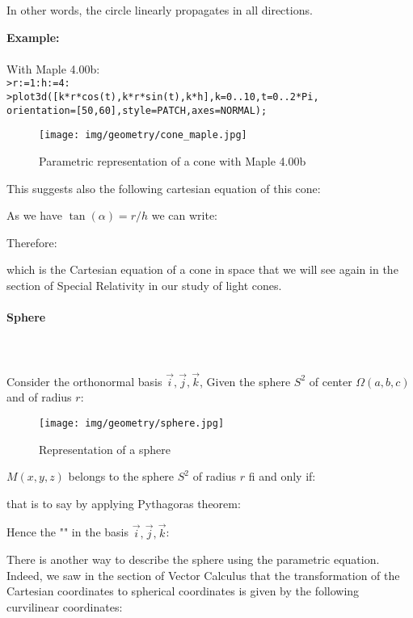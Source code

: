 {	In other words, the circle linearly propagates in all directions.
	\begin{tcolorbox}[colframe=black,colback=white,sharp corners]
	\textbf{{\Large {}}Example:}\\\\
	With Maple 4.00b:\\

	\texttt{>r:=1:h:=4:\\
	>plot3d([k*r*cos(t),k*r*sin(t),k*h],k=0..10,t=0..2*Pi,\\
	orientation=[50,60],style=PATCH,axes=NORMAL);
	}
	\begin{figure}[H]
		\centering
		\texttt{[image: img/geometry/cone\_maple.jpg]}
		\caption{Parametric representation of a cone with Maple 4.00b}
	\end{figure}
	\end{tcolorbox}
	This suggests also the following cartesian equation of this cone:
	
	As we have $\tan(\alpha)=r/h$ we can write:
	
	Therefore:
	
	which is the Cartesian equation of a cone in space that we will see again in the section of Special Relativity in our study of light cones.
	
	\paragraph{Sphere}\mbox{}\\\\
	Consider the orthonormal basis ${\vec{i},\vec{j},\vec{k}}$, Given the sphere $S^2$ of  center $\Omega(a,b,c)$ and of radius $r$:
	\begin{figure}[H]
		\centering
		\texttt{[image: img/geometry/sphere.jpg]}
		\caption{Representation of a sphere}
	\end{figure}
	$M(x,y,z)$ belongs to the sphere  $S^2$ of radius $r$ fi and only if:
	
	that is to say by applying Pythagoras theorem:
	
	Hence the "" in the basis ${\vec{i},\vec{j},\vec{k}}$:
	
	There is another way to describe the sphere using the parametric equation. Indeed, we saw in the section of Vector Calculus that the transformation of the Cartesian coordinates to spherical coordinates is given by the following curvilinear coordinates:
	
}
